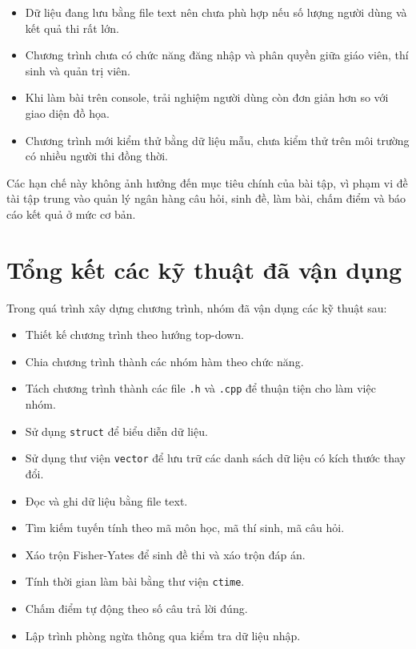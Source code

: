 \documentclass[12pt,a4paper]{article}
\begin{document}
\begin{itemize}
    \item Dữ liệu đang lưu bằng file text nên chưa phù hợp nếu số lượng người dùng và kết quả thi rất lớn.
    \item Chương trình chưa có chức năng đăng nhập và phân quyền giữa giáo viên, thí sinh và quản trị viên.
    \item Khi làm bài trên console, trải nghiệm người dùng còn đơn giản hơn so với giao diện đồ họa.
    \item Chương trình mới kiểm thử bằng dữ liệu mẫu, chưa kiểm thử trên môi trường có nhiều người thi đồng thời.
\end{itemize}

Các hạn chế này không ảnh hưởng đến mục tiêu chính của bài tập, vì phạm vi đề tài tập trung vào quản lý ngân hàng câu hỏi, sinh đề, làm bài, chấm điểm và báo cáo kết quả ở mức cơ bản.


\section{Tổng kết các kỹ thuật đã vận dụng}

Trong quá trình xây dựng chương trình, nhóm đã vận dụng các kỹ thuật sau:

\begin{itemize}
    \item Thiết kế chương trình theo hướng top-down.
    \item Chia chương trình thành các nhóm hàm theo chức năng.
    \item Tách chương trình thành các file \texttt{.h} và \texttt{.cpp} để thuận tiện cho làm việc nhóm.
    \item Sử dụng \texttt{struct} để biểu diễn dữ liệu.
    \item Sử dụng thư viện \texttt{vector} để lưu trữ các danh sách dữ liệu có kích thước thay đổi.
    \item Đọc và ghi dữ liệu bằng file text.
    \item Tìm kiếm tuyến tính theo mã môn học, mã thí sinh, mã câu hỏi.
    \item Xáo trộn Fisher-Yates để sinh đề thi và xáo trộn đáp án.
    \item Tính thời gian làm bài bằng thư viện \texttt{ctime}.
    \item Chấm điểm tự động theo số câu trả lời đúng.
    \item Lập trình phòng ngừa thông qua kiểm tra dữ liệu nhập.
\end{itemize}
\end{document}
